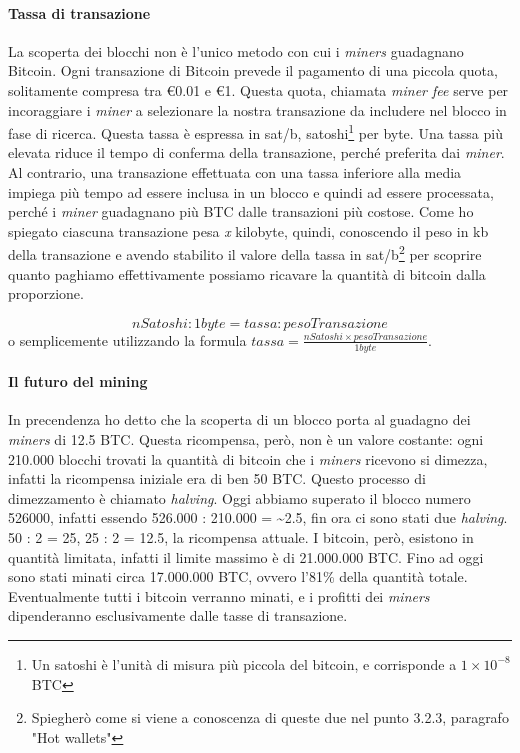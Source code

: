 \documentclass {article}
\begin{document}
\paragraph {Tassa di transazione}

La scoperta dei blocchi non è l'unico metodo con cui i \textit{miners} guadagnano Bitcoin.
Ogni transazione di Bitcoin prevede il pagamento di una piccola quota, solitamente compresa tra \euro{0.01} e \euro{1}.
Questa quota, chiamata \textit{miner fee} serve per incoraggiare i \textit{miner} a selezionare la nostra transazione da includere nel blocco in fase di ricerca.
Questa tassa è espressa in sat/b, satoshi\footnote{Un satoshi è l'unità di misura più piccola del bitcoin, e corrisponde a $1 \times 10^{-8}$ BTC} per byte.
Una tassa più elevata riduce il tempo di conferma della transazione, perché preferita dai \textit{miner}. Al contrario, una transazione effettuata con una tassa inferiore alla media impiega più tempo ad essere inclusa in un blocco e quindi ad essere processata, perché i \textit{miner} guadagnano più BTC dalle transazioni più costose.
Come ho spiegato ciascuna transazione pesa \textit{x} kilobyte, quindi, conoscendo il peso in kb della transazione e avendo stabilito il valore della tassa in sat/b\footnote{Spiegherò come si viene a conoscenza di queste due nel punto 3.2.3, paragrafo "Hot wallets"} per scoprire quanto paghiamo effettivamente possiamo ricavare la quantità di bitcoin dalla proporzione.

$$ nSatoshi : 1 byte = tassa : pesoTransazione $$
%
o semplicemente utilizzando la formula $tassa = \frac{nSatoshi \times pesoTransazione}{1 byte}$.

\paragraph {Il futuro del mining}

In precendenza ho detto che la scoperta di un blocco porta al guadagno dei \textit{miners} di 12.5 BTC.
Questa ricompensa, però, non è un valore costante: ogni 210.000 blocchi trovati la quantità di bitcoin che i \textit{miners} ricevono si dimezza, infatti la ricompensa iniziale era di ben 50 BTC. Questo processo di dimezzamento è chiamato \textit{halving}.
Oggi abbiamo superato il blocco numero 526000, infatti essendo 526.000 : 210.000 = \textasciitilde 2.5, fin ora ci sono stati due \textit{halving}.
50 : 2 = 25, 25 : 2 = 12.5, la ricompensa attuale.
I bitcoin, però, esistono in quantità limitata, infatti il limite massimo è di 21.000.000 BTC.
Fino ad oggi sono stati minati circa 17.000.000 BTC, ovvero l'81\% della quantità totale.
Eventualmente tutti i bitcoin verranno minati, e i profitti dei \textit{miners} dipenderanno esclusivamente dalle tasse di transazione.
\end{document}
